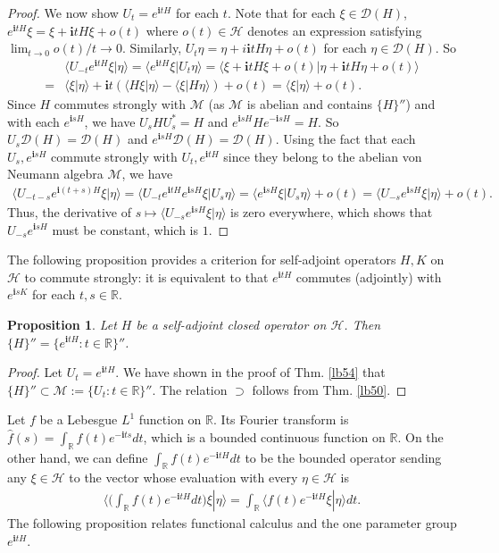 \documentclass[12pt,b5paper,notitlepage]{article}
\theoremstyle{definition}
\theoremstyle{plain}
\newtheorem{pp}[df]{Proposition}
\newcommand{\mc}{\mathcal}
\newcommand{\wht}{\widehat}
\newcommand{\Dom}{\scr D}
\newcommand{\bk}[1]{\langle {#1}\rangle}
\newcommand{\scr}{\mathscr}
\newcommand{\im}{\mathbf{i}}
\newcommand{\Rbb}{\mathbb R}
\numberwithin{equation}{section}
\begin{document}
\begin{proof}
We now show $U_t=e^{\im tH}$ for each $t$. Note that for each $\xi\in\Dom(H)$, $e^{\im tH}\xi=\xi+\im tH\xi+o(t)$ where $o(t)\in\mc H$ denotes an expression satisfying $\lim_{t\rightarrow 0}o(t)/t\rightarrow 0$. Similarly, $U_t\eta=\eta+i\im tH\eta+o(t)$ for each $\eta\in\Dom(H)$. So
\begin{align*}
&\bk{U_{-t}e^{\im tH}\xi|\eta}=\bk{e^{\im tH}\xi|U_t\eta}=\bk{\xi+\im tH\xi+o(t)|\eta+\im tH\eta+o(t)}\\
=&\bk{\xi|\eta}+\im t(\bk{H\xi|\eta}-\bk{\xi|H\eta})+o(t)=\bk{\xi|\eta}+o(t).	
\end{align*}
Since $H$ commutes strongly with $\mc M$ (as $\mc M$ is abelian and contains $\{H\}''$) and with each $e^{\im sH}$, we have $U_sHU_s^*=H$ and $e^{\im sH}H e^{-\im sH}=H$. So $U_s\Dom(H)=\Dom(H)$ and  $e^{\im sH}\Dom(H)=\Dom(H)$. Using the fact that each $U_s,e^{\im sH}$ commute strongly with $U_t,e^{\im t H}$ since they belong to the abelian von Neumann algebra $\mc M$, we have
\begin{align*}
\bk{U_{-t-s}e^{\im (t+s)H}\xi|\eta}=\bk{U_{-t}e^{\im tH}e^{\im sH}\xi|U_s\eta}=\bk{e^{\im sH}\xi|U_s\eta}+o(t)=\bk{U_{-s}e^{\im sH}\xi|\eta}+o(t).
\end{align*}
Thus, the derivative of $s\mapsto \bk{U_{-s}e^{\im sH}\xi|\eta}$ is zero everywhere, which shows that $U_{-s}e^{\im sH}$ must be constant, which is $1$.
\end{proof}


The following proposition provides a criterion for self-adjoint operators $H,K$ on $\mc H$ to commute strongly: it is equivalent to that $e^{\im tH}$ commutes (adjointly) with $e^{\im sK}$ for each $t,s\in\Rbb$.


\begin{pp}
Let $H$ be a self-adjoint closed operator on $\mc H$. Then $\{H\}''=\{e^{\im tH}:t\in\Rbb\}''$.
\end{pp}

\begin{proof}
Let $U_t=e^{\im tH}$. We have shown in the proof of Thm. \ref{lb54} that $\{H\}''\subset \mc M:=\{U_t:t\in\Rbb\}''$. The relation $\supset$ follows from Thm. \ref{lb50}.
\end{proof}



Let $f$ be a Lebesgue $L^1$ function on $\Rbb$. Its Fourier transform is $\wht f(s)=\int_\Rbb f(t)e^{-\im ts}dt$, which is a bounded continuous function on $\Rbb$. On the other hand, we can define $\int_\Rbb f(t)e^{-\im tH}dt$ to be the bounded operator sending any $\xi\in\mc H$ to the vector whose evaluation with every $\eta\in\mc H$ is
\begin{align*}
\Big\langle \big(\int_\Rbb f(t)e^{-\im tH}dt\big)\xi|\eta  \Big\rangle	=\int_\Rbb\big\langle f(t)e^{-\im tH}\xi|\eta\big\rangle dt.
\end{align*} 
The following proposition relates functional calculus and the one parameter group $e^{\im tH}$.
\end{document}
